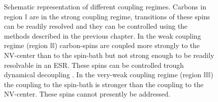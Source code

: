 \begin{figure}[htbp]
\centering
    \caption{ Schematic representation of different coupling regimes. Carbons in region $\mathbb{I} $ are in the strong coupling regime, transitions of these spins can be readily resolved and they can be controlled using the methods described in the previous chapter.
    In the weak coupling regime (region $\mathbb{II}$) carbon-spins are coupled more strongly to the NV-center than to the spin-bath but not strong enough to be readily resolvable in an ESR. These spins can be controlled trough dynamical decoupling \citep{Taminiau2012Detection}.
    In the very-weak coupling regime (region $\mathbb{III}$) the coupling to the spin-bath is stronger than the coupling to the NV-center. These spins cannot presently be addressed.}
    \label{fig:coupling regimes}
\end{figure}



